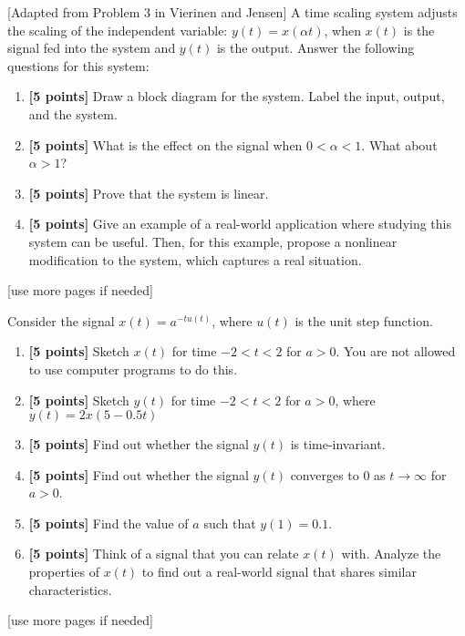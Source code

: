 \documentclass{ee102_pset}
\author{\rule{3cm}{0.4pt}} %
\begin{document}

[Adapted from Problem 3 in Vierinen and Jensen] A time scaling system adjusts the scaling of the independent variable: $y(t) = x(\alpha t)$, when $x(t)$ is the signal fed into the system
and $y(t)$ is the output. Answer the following questions for this system:
\begin{enumerate}
    \item \textbf{[5 points]} Draw a block diagram for the system. Label the input, output, and the system.
    \item \textbf{[5 points]} What is the effect on the signal when $0 < \alpha < 1$. What about $\alpha > 1$?
    \item \textbf{[5 points]} Prove that the system is linear.
    \item \textbf{[5 points]} Give an example of a real-world application where studying this system can be useful. Then, for this example, propose a nonlinear modification to the system, which captures a real situation.  
\end{enumerate}

\vspace*{\fill}
\begin{center}
[use more pages if needed]
\end{center}
Consider the signal $x(t) = a^{-tu(t)}$, where $u(t)$ is the unit step function. 
\begin{enumerate}
    \item \textbf{[5 points]} Sketch $x(t)$ for time $-2 < t < 2$ for $a > 0$. You are not allowed to use computer programs to do this.
    \item \textbf{[5 points]} Sketch $y(t)$ for time $-2 < t < 2$ for $a>0$, where $y(t) = 2x(5 - 0.5t)$
    \item \textbf{[5 points]} Find out whether the signal $y(t)$ is time-invariant.
    \item \textbf{[5 points]} Find out whether the signal $y(t)$ converges to 0 as $t \to \infty$ for $a > 0$. 
    \item \textbf{[5 points]} Find the value of $a$ such that $y(1) = 0.1$.
    \item \textbf{[5 points]} Think of a signal that you can relate $x(t)$ with. Analyze the properties of $x(t)$ to find out a real-world signal that shares similar characteristics.
\end{enumerate}
\vspace*{\fill}
\begin{center}
[use more pages if needed]
\end{center}
\end{document}
